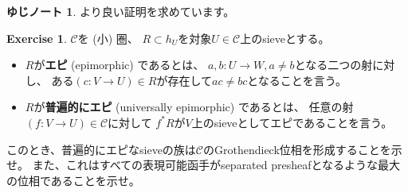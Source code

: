 \documentclass[uplatex]{jsarticle}
\theoremstyle{definition}
\newtheorem{prob}[prob]{Exercise}
\newtheorem*{rrem*}{ゆじノート}
\def\mcC{\mathcal{C}}
\begin{document}
\begin{rrem*}
  より良い証明を求めています。
\end{rrem*}


\begin{prob}\label{prob: 0.8}
  \(\mcC\)を (小) 圏、
  \(R\subset h_U\)を対象\(U\in \mcC\)上のsieveとする。
  \begin{itemize}
    \item
    \(R\)が\textbf{エピ} (epimorphic) であるとは、
    \(a,b:U\to W, a\neq b\)となる二つの射に対し、
    ある\((c:V\to U)\in R\)が存在して\(ac\neq bc\)となることを言う。
    \item
    \(R\)が\textbf{普遍的にエピ} (universally epimorphic) であるとは、
    任意の射\((f:V\to U)\in \mcC\)に対して
    \(f^*R\)が\(V\)上のsieveとしてエピであることを言う。
  \end{itemize}
  このとき、普遍的にエピなsieveの族は\(\mcC\)のGrothendieck位相を形成することを示せ。
  また、これはすべての表現可能函手がseparated presheafとなるような最大の位相であることを示せ。
\end{prob}
\end{document}
